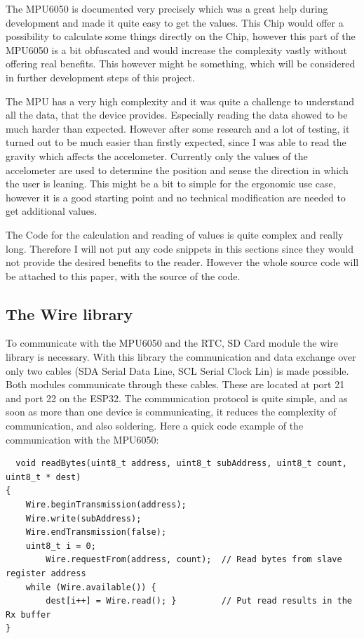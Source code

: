 The MPU6050 is documented very precisely which was a great help during development and made it quite easy to get the values. This Chip would offer a possibility to calculate some things directly on the Chip, however this part of the MPU6050 is a bit obfuscated and would increase the complexity vastly without offering real benefits. This however might be something, which will be considered in further development steps of this project.

The MPU has a very high complexity and it was quite a challenge to understand all the data, that the device provides. Especially reading the data showed to be much harder than expected. However after some research and a lot of testing, it turned out to be much easier than firstly expected, since I was able to read the gravity which affects the accelometer.
Currently only the values of the accelometer are used to determine the position and sense the direction in which the user is leaning. This might be a bit to simple for the ergonomic use case, however it is a good starting point and no technical modification are needed to get additional values.

The Code for the calculation and reading of values is quite complex and really long. Therefore I will not put any code snippets in this sections since they would not provide the desired benefits to the reader. However the whole source code will be attached to this paper, with the source of the code. \cite{TDKAttra32:online}

\newpage

\subsection{The Wire library}

To communicate with the MPU6050 and the RTC, SD Card module the wire library is necessary. With this library the communication and data exchange over only two cables (SDA Serial Data Line, SCL Serial Clock Lin) is made possible. Both modules communicate through these cables. These are located at port 21 and port 22 on the ESP32. The communication protocol is quite simple, and as soon as more than one device is communicating, it reduces the complexity of communication, and also soldering. Here a quick code example of the communication with the MPU6050:
\begin{lstlisting}
  void readBytes(uint8_t address, uint8_t subAddress, uint8_t count, uint8_t * dest)
{  
	Wire.beginTransmission(address);   
	Wire.write(subAddress);            
	Wire.endTransmission(false);       
	uint8_t i = 0;
        Wire.requestFrom(address, count);  // Read bytes from slave register address 
	while (Wire.available()) {
        dest[i++] = Wire.read(); }         // Put read results in the Rx buffer
}
\end{lstlisting}

